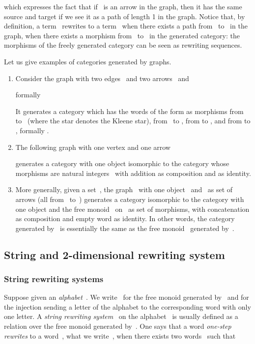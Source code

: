\documentclass{LMCS}
\begin{document}
which expresses the fact that if~ is an arrow in the graph, then it
has the same source and target if we see it as a path of length 1 in the
graph. Notice that, by definition, a term~ rewrites to a term~ when there
exists a path from~ to~ in the graph, \ie when there exists a morphism
from~ to~ in the generated category: the morphisms of the freely generated
category can be seen as rewriting sequences.

\begin{exa}
  \label{ex:fcat}
  Let us give examples of categories generated by graphs.
  \begin{enumerate}
  \item Consider the graph with two edges~ and two arrows~
    and~\hbox{}
    
    \ie formally
    
    It generates a category which has the words of the form  as
    morphisms from~ to~ (where the star denotes the Kleene star),
     from~ to ,  from  to , and  from 
    to , \ie formally .
\item The following graph with one vertex and one arrow
    
    generates a category with one object isomorphic to the category whose
    morphisms are natural integers~ with addition as composition and  as
    identity.
  \item More generally, given a set~, the graph~ with one
    object~ and~ as set of arrows (all from~ to~)
    generates a category isomorphic to the category with one object and the free
    monoid~ on~ as set of morphisms, with concatenation as
    composition and empty word as identity. In other words, the category
    generated by~ is essentially the same as the free
    monoid~ generated by~.
  \end{enumerate}
\end{exa}

\subsection{String and 2-dimensional rewriting system}
\label{sec:rs-2}
\subsubsection{String rewriting systems}
Suppose given an \emph{alphabet}~. We write~ for the free monoid
generated by~ and  for the injection sending a letter of
the alphabet to the corresponding word with only one letter. A \emph{string
  rewriting system}~ on the alphabet~ is usually defined as a relation
 over the free monoid generated by~. One says
that a word  \emph{one-step rewrites} to a word~, what we write~,
when there exists two words~ such that
\end{document}

